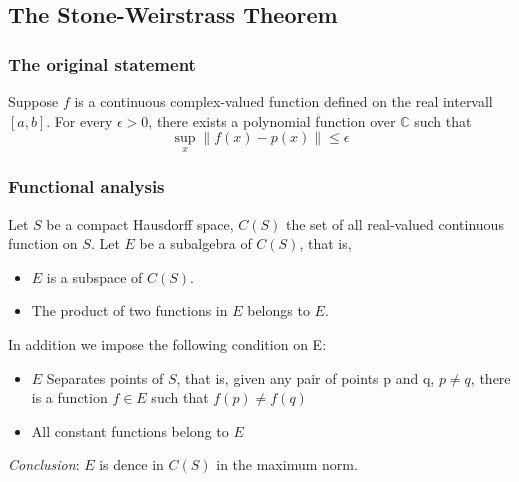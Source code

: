 \documentclass[titlepage]{article}
\begin{document}
\subsection{The Stone-Weirstrass Theorem}
\subsubsection{The original statement}
Suppose $f$ is a continuous complex-valued function defined on the real intervall $[a,b]$. For every $\epsilon>0$, there exists a polynomial function over $\mathbb{C}$ such that 
\begin{equation}
\sup_x\| f(x) - p(x)\| \leq \epsilon
\end{equation}
\subsubsection{Functional analysis}
Let $S$ be a compact Hausdorff space, $C(S)$ the set of all real-valued continuous function on $S$. Let $E$ be a subalgebra of $C(S)$, that is,
\begin{itemize}
\item $E$ is a subspace of $C(S)$.
\item The product of two functions in $E$ belongs to $E$.
\end{itemize}
In addition we impose the following condition on E:
\begin{itemize}
\item $E$ Separates points of $S$, that is, given any pair of points p and q, $p\neq q$, there is a function $f\in E$ such that $f(p) \neq f(q)$
\item All constant functions belong to $E$
\end{itemize}
\textit{Conclusion}: $E$ is dence in $C(S)$ in the maximum norm.
\end{document}
